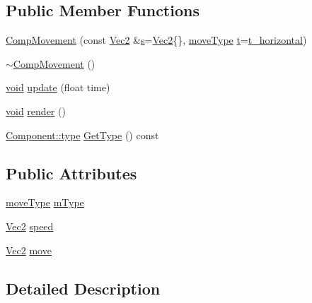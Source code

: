 \subsection*{Public Member Functions}
\begin{DoxyCompactItemize}
\item 
\hyperlink{class_comp_movement_a1979cc3ed3109370762d40c7a3f2786f}{Comp\-Movement} (const \hyperlink{class_vec2}{Vec2} \&\hyperlink{_s_d_l__opengl_8h_a4af680a6c683f88ed67b76f207f2e6e4}{s}=\hyperlink{class_vec2}{Vec2}\{\}, \hyperlink{class_comp_movement_a5be67228360a37b9032bd70d44856c83}{move\-Type} \hyperlink{_s_d_l__opengl_8h_a7d65d00ca3b0630d9b5c52df855b19f5}{t}=\hyperlink{class_comp_movement_a5be67228360a37b9032bd70d44856c83a1cd5577a817502a6c18ee1ee928da3d8}{t\-\_\-horizontal})
\item 
\hyperlink{class_comp_movement_aede23cf3ec622ac7089cd2fa672129da}{$\sim$\-Comp\-Movement} ()
\item 
\hyperlink{_s_d_l__opengles2__gl2ext_8h_ae5d8fa23ad07c48bb609509eae494c95}{void} \hyperlink{class_comp_movement_a9d20396d3bf2646bb8e0d2fffc0cccd0}{update} (float time)
\item 
\hyperlink{_s_d_l__opengles2__gl2ext_8h_ae5d8fa23ad07c48bb609509eae494c95}{void} \hyperlink{class_comp_movement_ad387deb1874044cca15dd58a014e3544}{render} ()
\item 
\hyperlink{class_component_ad6d161b6acf7b843b55bb9feac7af71a}{Component\-::type} \hyperlink{class_comp_movement_a922f5115a34e151e9414141ac8f0c324}{Get\-Type} () const 
\end{DoxyCompactItemize}
\subsection*{Public Attributes}
\begin{DoxyCompactItemize}
\item 
\hyperlink{class_comp_movement_a5be67228360a37b9032bd70d44856c83}{move\-Type} \hyperlink{class_comp_movement_a3ce2f7a3d0feb7684213440ec2f971a9}{m\-Type}
\item 
\hyperlink{class_vec2}{Vec2} \hyperlink{class_comp_movement_acbead672c47587a0221fae8ecd97258e}{speed}
\item 
\hyperlink{class_vec2}{Vec2} \hyperlink{class_comp_movement_a3c73427a019d8457e239bacaaf30882f}{move}
\end{DoxyCompactItemize}


\subsection{Detailed Description}


